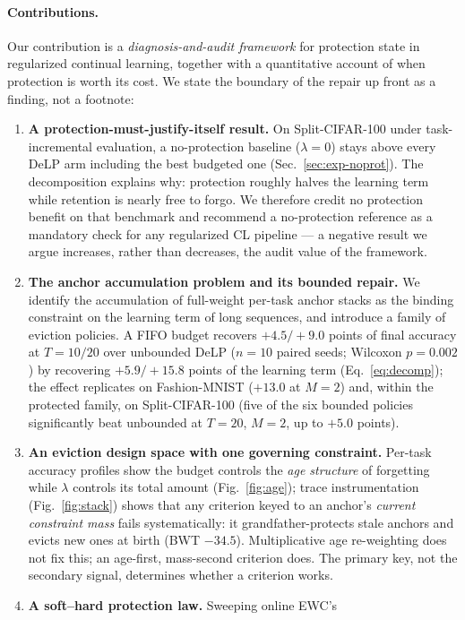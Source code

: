 \documentclass[review,11pt,number]{elsarticle}
\newcommand{\delp}{DeLP}
\begin{document}
\paragraph{Contributions.}
Our contribution is a \emph{diagnosis-and-audit framework} for
protection state in regularized continual learning, together with a
quantitative account of when protection is worth its cost. We state the
boundary of the repair up front as a finding, not a footnote:
\begin{enumerate}
\item \textbf{A protection-must-justify-itself result.} On
Split-CIFAR-100 under task-incremental evaluation, a no-protection
baseline ($\lambda{=}0$) stays above every \delp{} arm including the
best budgeted one (Sec.~\ref{sec:exp-noprot}). The decomposition
explains why: protection roughly halves the learning term while
retention is nearly free to forgo. We therefore credit no protection
benefit on that benchmark and recommend a no-protection reference as a
mandatory check for any regularized CL pipeline --- a negative result
we argue increases, rather than decreases, the audit value of the
framework.
\item \textbf{The anchor accumulation problem and its bounded repair.}
We identify the accumulation of full-weight per-task anchor stacks as
the binding constraint on the learning term of long sequences, and
introduce a family of eviction policies. A FIFO budget recovers
$+4.5/+9.0$ points of final accuracy at $T{=}10/20$ over unbounded
\delp{} ($n{=}10$ paired seeds; Wilcoxon $p{=}0.002$) by recovering
$+5.9/+15.8$ points of the learning term (Eq.~\ref{eq:decomp}); the
effect replicates on Fashion-MNIST ($+13.0$ at $M{=}2$) and, within the
protected family, on Split-CIFAR-100 (five of the six bounded policies significantly beat
unbounded at $T{=}20$, $M{=}2$, up to $+5.0$ points).
\item \textbf{An eviction design space with one governing constraint.}
Per-task accuracy profiles show the budget controls the \emph{age
structure} of forgetting while $\lambda$ controls its total amount
(Fig.~\ref{fig:age}); trace instrumentation (Fig.~\ref{fig:stack}) shows
that any criterion keyed to an anchor's \emph{current constraint mass}
fails systematically: it grandfather-protects stale anchors and evicts
new ones at birth (BWT $-34.5$). Multiplicative age re-weighting does
not fix this; an age-first, mass-second criterion does. The primary key,
not the secondary signal, determines whether a criterion works.
\item \textbf{A soft--hard protection law.} Sweeping online EWC's

\end{enumerate}
\end{document}
